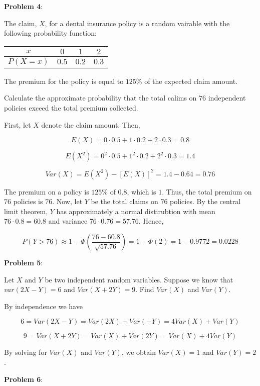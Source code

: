\documentclass{article}
\begin{document}
\noindent\textbf{Problem 4}:

The claim, $X$, for a dental insurance policy is a random vairable with the following probability function:

\begin{center}
    \begin{tabular}{|c|c|c|c|}
        \hline
        $x$&$0$&$1$&$2$\\
        \hline
        $P(X=x)$&$0.5$&$0.2$&$0.3$\\
        \hline
    \end{tabular}
\end{center}

The premium for the policy is equal to $125\%$ of the expected claim amount.

Calculate the approximate probability that the total calims on $76$ independent policies exceed the total premium collected.

{\color{blue}

First, let $X$ denote the claim amount. Then,

$$E(X)=0\cdot0.5+1\cdot0.2+2\cdot0.3=0.8$$

$$E(X^2)=0^2\cdot0.5+1^2\cdot0.2+2^2\cdot0.3=1.4$$

$$Var(X)=E(X^2)-[E(X)]^2=1.4-0.64=0.76$$

The premium on a policy is $125\%$ of $0.8$, which is $1$. Thus, the total premium on $76$ policies is $76$. Now, let $Y$ be the total claims on $76$ policies. By the central limit theorem, $Y$ has approximately a normal distirubtion with mean $76\cdot0.8=60.8$ and variance $76\cdot0.76=57.76$. Hence,

$$P(Y>76)\approx1-\Phi(\frac{76-60.8}{\sqrt{57.76}})=1-\Phi(2)=1-0.9772=0.0228$$

}

\noindent\textbf{Problem 5}:

Let $X$ and $Y$ be two independent random variables. Suppose we know that $var(2X-Y)=6$ and $Var(X+2Y)=9$. Find $Var(X)$ and $Var(Y)$.

{\color{blue}

By independence we have

$$6=Var(2X-Y)=Var(2X)+Var(-Y)=4Var(X)+Var(Y)$$

$$9=Var(X+2Y)=Var(X)+Var(2Y)=Var(X)+4Var(Y)$$

By solving for $Var(X)$ and $Var(Y)$, we obtain $Var(X)=1$ and $Var(Y)=2$.

}

\noindent\textbf{Problem 6}:
\end{document}
